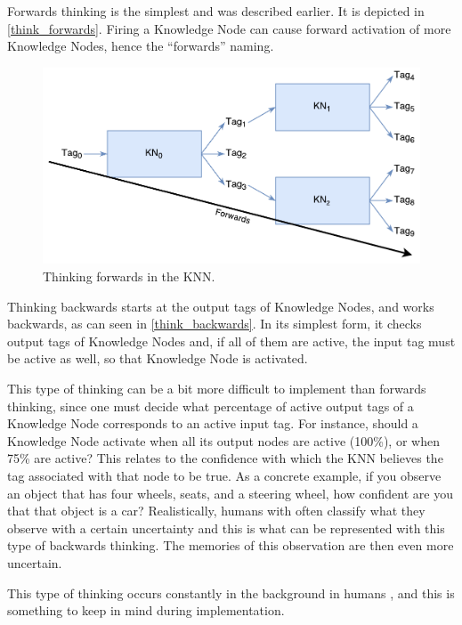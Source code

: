 \documentclass[titlepage,11pt]{article}
\begin{document}
Forwards thinking is the simplest and was described earlier. It is depicted in \autoref{think_forwards}. Firing a Knowledge Node can cause forward activation of more Knowledge Nodes, hence the ``forwards'' naming.

\begin{figure}[!htb]
	\includegraphics[width=\columnwidth]{figures/forwards_thinking.pdf}
	\caption{Thinking forwards in the KNN.}
	\label{think_forwards}
\end{figure}

Thinking backwards starts at the output tags of Knowledge Nodes, and works backwards, as can seen in \autoref{think_backwards}. In its simplest form, it checks output tags of Knowledge Nodes and, if all of them are active, the input tag must be active as well, so that Knowledge Node is activated.

This type of thinking can be a bit more difficult to implement than forwards thinking, since one must decide what percentage of active output tags of a Knowledge Node corresponds to an active input tag. For instance, should a Knowledge Node activate when all its output nodes are active (100\%), or when 75\% are active? This relates to the confidence with which the KNN believes the tag associated with that node to be true. As a concrete example, if you observe an object that has four wheels, seats, and a steering wheel, how confident are you that that object is a car? Realistically, humans with often classify what they observe with a certain uncertainty and this is what can be represented with this type of backwards thinking. The memories of this observation are then even more uncertain.

This type of thinking occurs constantly in the background in humans \cite{vybihal-knowledge}, and this is something to keep in mind during implementation.
\end{document}

